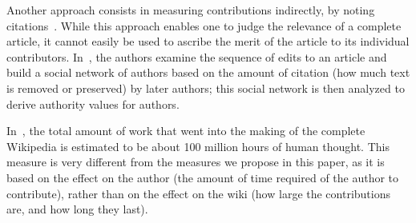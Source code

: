 Another approach consists in measuring contributions indirectly, by
noting citations~\cite{PageRank98,AckCounting2004,WikiMTWtrust06}.
While this approach enables one to judge the relevance of a complete
article, it cannot easily be used to ascribe the merit of the
article to its individual contributors. 
In~\cite{KPB2006}, the authors examine the sequence of edits
to an article and build a social network of authors based
on the amount of citation (how much text is removed or preserved)
by later authors; this social network is then analyzed to derive
authority values for authors. 

In~\cite{CognitiveSurplus2008}, the total amount of work that went
into the making of the complete Wikipedia is estimated to be about 
100 million hours of human thought. 
This measure is very different from the measures we
propose in this paper, as it is based on the effect on
the author (the amount of time required of the author to contribute),
rather than on the effect on the wiki (how large the
contributions are, and how long they last). 


